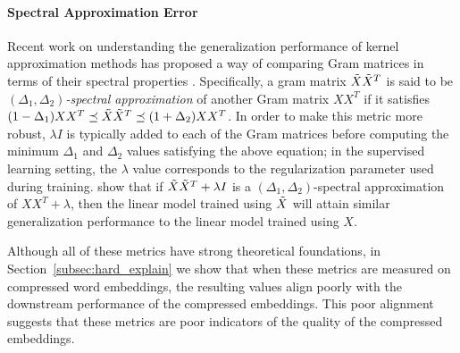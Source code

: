 
\paragraph{Spectral Approximation Error}
Recent work on understanding the generalization performance of kernel approximation methods has proposed a way of comparing Gram matrices in terms of their spectral properties \citep{avron17,lprff18}.
Specifically, a gram matrix $\tX\tX^T$ is said to be \textit{$(\Delta_1,\Delta_2)$-spectral approximation} of another Gram matrix $XX^T$ if it satisfies $(1-\Delta_1) XX^T \preceq \tX\tX^T \preceq (1+\Delta_2)XX^T$.
In order to make this metric more robust, $\lambda I$ is typically added to each of the Gram matrices before computing the minimum $\Delta_1$ and $\Delta_2$ values satisfying the above equation;
in the supervised learning setting, the $\lambda$ value corresponds to the regularization parameter used during training.
\citet{lprff18} show that if $\tX\tX^T+\lambda I$ is a $(\Delta_1,\Delta_2)$-spectral approximation of $XX^T + \lambda$, then the linear model trained using $\tX$ will attain similar generalization performance to the linear model trained using $X$.

Although all of these metrics have strong theoretical foundations, in Section~\ref{subsec:hard_explain} we show that when these metrics are measured on compressed word embeddings, the resulting values align poorly with the downstream performance of the compressed embeddings.
This poor alignment suggests that these metrics are poor indicators of the quality of the compressed embeddings.

